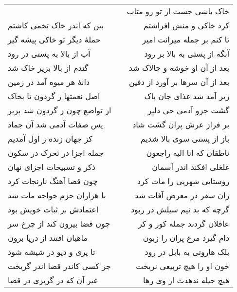 \begin{center}
\begin{longtable}{l p{0.5cm} r}
&&
خاک باشی جست از تو رو متاب
\\
بین که اندر خاک تخمی کاشتم
&&
کرد خاکی و منش افراشتم
\\
حملهٔ دیگر تو خاکی پیشه گیر
&&
تا کنم بر جمله میرانت امیر
\\
آب از بالا به پستی در رود
&&
آنگه از پستی به بالا بر رود
\\
گندم از بالا بزیر خاک شد
&&
بعد از آن او خوشه و چالاک شد
\\
دانهٔ هر میوه آمد در زمین
&&
بعد از آن سرها بر آورد از دفین
\\
اصل نعمتها ز گردون تا بخاک
&&
زیر آمد شد غذای جان پاک
\\
از تواضع چون ز گردون شد بزیر
&&
گشت جزو آدمی حی دلیر
\\
پس صفات آدمی شد آن جماد
&&
بر فراز عرش پران گشت شاد
\\
کز جهان زنده ز اول آمدیم
&&
باز از پستی سوی بالا شدیم
\\
جمله اجزا در تحرک در سکون
&&
ناطقان که انا الیه راجعون
\\
ذکر و تسبیحات اجزای نهان
&&
غلغلی افکند اندر آسمان
\\
چون قضا آهنگ نارنجات کرد
&&
روستایی شهریی را مات کرد
\\
با هزاران حزم خواجه مات شد
&&
زان سفر در معرض آفات شد
\\
اعتمادش بر ثبات خویش بود
&&
گرچه که بد نیم سیلش در ربود
\\
چون قضا بیرون کند از چرخ سر
&&
عاقلان گردند جمله کور و کر
\\
ماهیان افتند از دریا برون
&&
دام گیرد مرغ پران را زبون
\\
تا پری و دیو در شیشه شود
&&
بلک هاروتی به بابل در رود
\\
جز کسی کاندر قضا اندر گریخت
&&
خون او را هیچ تربیعی نریخت
\\
غیر آن که در گریزی در قضا
&&
هیچ حیله ندهدت از وی رها
\\
\end{longtable}
\end{center}
